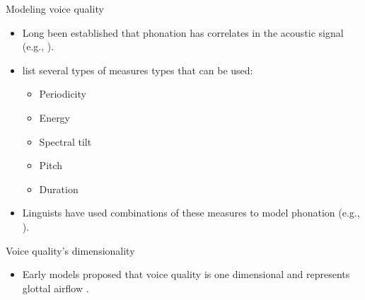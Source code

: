 \documentclass{beamer}
\begin{document}
\begin{frame}{Modeling voice quality}
  \begin{itemize}
    \item Long been established that phonation has correlates in the acoustic signal (e.g., \cite{fischer-jorgensenPhoneticAnalysisBreathy1968,klattAnalysisSynthesisPerception1990}).
    \item \citet{gordonPhonationTypesCrosslinguistic2001} list several types of measures types that can be used:
    \begin{itemize}
    \item Periodicity
    \item Energy
    \item Spectral tilt
    \item Pitch
    \item Duration 
    \end{itemize}
  \item Linguists have used combinations of these measures to model phonation (e.g., \cite{blankenshipTimingNonmodalPhonation2002,brunelleTonePhonationSoutheast2016,espositoAcousticElectroglottographicStudy2012}). 
  \end{itemize}
\end{frame}

\begin{frame}{Voice quality's dimensionality}
  \begin{itemize}
    \item Early models proposed that voice quality is one dimensional and represents glottal airflow \citep{ladefogedPreliminariesLinguisticPhonetics1971,ladefogedSoundsWorldsLanguages1996}.
  \end{itemize}
  \begin{figure}[h!]
\end{figure}
\end{frame}
\end{document}
